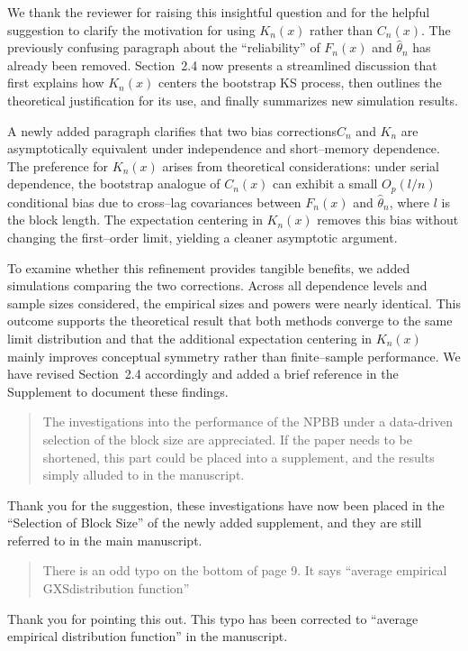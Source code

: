\documentclass[12pt]{article}
\newenvironment{comment}%
{\begin{quotation}\noindent\small\it\color{darkblue}\ignorespaces%
}{\end{quotation}}
\begin{document}
We thank the reviewer for raising this insightful question and for the
helpful suggestion to clarify the motivation for using $K_n(x)$ rather
than $C_n(x)$.  The previously confusing paragraph about the
``reliability'' of $F_n(x)$ and $\hat\theta_n$ has already been removed.
Section~2.4 now presents a streamlined discussion that first explains how
$K_n(x)$ centers the bootstrap KS process, then outlines the theoretical
justification for its use, and finally summarizes new simulation results.


A newly added paragraph clarifies that two bias corrections$C_n$ and
$K_n$ are asymptotically equivalent under independence and
short--memory dependence.  The preference for $K_n(x)$ arises from
theoretical considerations: under serial dependence, the bootstrap
analogue of $C_n(x)$ can exhibit a small $O_p(l/n)$ conditional bias
due to cross--lag covariances between $F_n(x)$ and $\hat\theta_n$,
where $l$ is the block length.  The expectation centering in $K_n(x)$
removes this bias without changing the first--order limit, yielding a
cleaner asymptotic argument.


To examine whether this refinement provides tangible benefits, we added
simulations comparing the two corrections.  Across all dependence levels
and sample sizes considered, the empirical sizes and powers were nearly
identical.  This outcome supports the theoretical result that both
methods converge to the same limit distribution and that the additional
expectation centering in $K_n(x)$ mainly improves conceptual symmetry
rather than finite--sample performance.  We have revised
Section~2.4 accordingly and added a brief reference in the Supplement to
document these findings.


\begin{comment}
The investigations into the performance of the NPBB under a
data-driven selection of the block size are appreciated.  If the paper
needs to be shortened, this part could be placed into a supplement,
and the results simply alluded to in the manuscript.
\end{comment}

Thank you for the suggestion, these investigations have now been
placed in the ``Selection of Block Size'' of the newly added
supplement, and they are still referred to in the main manuscript.

\begin{comment}
There is an odd typo on the bottom of page 9. It says ``average
empirical GXSdistribution function''
\end{comment}

Thank you for pointing this out. This typo has been
corrected to ``average empirical distribution function'' in the manuscript.





\end{document}
